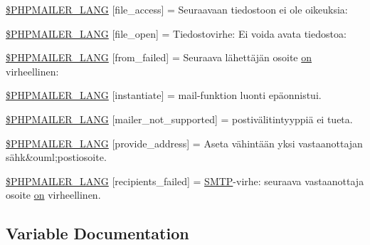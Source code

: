 \begin{DoxyCompactItemize}
\hyperlink{phpmailer_8lang-fi_8php_a7e83349023b856ef9e5c46e30ae6d51e}{\$\+P\+H\+P\+M\+A\+I\+L\+E\+R\+\_\+\+L\+A\+NG} \mbox{[}\textquotesingle{}file\+\_\+access\textquotesingle{}\mbox{]} = \textquotesingle{}Seuraavaan tiedostoon ei ole oikeuksia\+: \textquotesingle{}
\item 
\hyperlink{phpmailer_8lang-fi_8php_a28d1a6517bf4c942a0ddd506188ad2e0}{\$\+P\+H\+P\+M\+A\+I\+L\+E\+R\+\_\+\+L\+A\+NG} \mbox{[}\textquotesingle{}file\+\_\+open\textquotesingle{}\mbox{]} = \textquotesingle{}Tiedostovirhe\+: Ei voida avata tiedostoa\+: \textquotesingle{}
\item 
\hyperlink{phpmailer_8lang-fi_8php_adf832ae12155a09be077c6d5e4fd7e22}{\$\+P\+H\+P\+M\+A\+I\+L\+E\+R\+\_\+\+L\+A\+NG} \mbox{[}\textquotesingle{}from\+\_\+failed\textquotesingle{}\mbox{]} = \textquotesingle{}Seuraava lähettäjän osoite \hyperlink{fullpage_2plugin_8min_8js_a0258429d15d28b8440a6c44b3a15f390}{on} virheellinen\+: \textquotesingle{}
\item 
\hyperlink{phpmailer_8lang-fi_8php_ad58dde16780f4770ccf4dd282ea1f5ad}{\$\+P\+H\+P\+M\+A\+I\+L\+E\+R\+\_\+\+L\+A\+NG} \mbox{[}\textquotesingle{}instantiate\textquotesingle{}\mbox{]} = \textquotesingle{}mail-\/funktion luonti epäonnistui.\textquotesingle{}
\item 
\hyperlink{phpmailer_8lang-fi_8php_aa2ebcb8833ee83a7ad67401c4bb3a6ad}{\$\+P\+H\+P\+M\+A\+I\+L\+E\+R\+\_\+\+L\+A\+NG} \mbox{[}\textquotesingle{}mailer\+\_\+not\+\_\+supported\textquotesingle{}\mbox{]} = \textquotesingle{}postivälitintyyppiä ei tueta.\textquotesingle{}
\item 
\hyperlink{phpmailer_8lang-fi_8php_a8b97897c2406b7392b056f375feeefbb}{\$\+P\+H\+P\+M\+A\+I\+L\+E\+R\+\_\+\+L\+A\+NG} \mbox{[}\textquotesingle{}provide\+\_\+address\textquotesingle{}\mbox{]} = \textquotesingle{}Aseta vähintään yksi vastaanottajan sähk\&ouml;postiosoite.\textquotesingle{}
\item 
\hyperlink{phpmailer_8lang-fi_8php_a7589d30bb9b368327c2df015f3e6bcba}{\$\+P\+H\+P\+M\+A\+I\+L\+E\+R\+\_\+\+L\+A\+NG} \mbox{[}\textquotesingle{}recipients\+\_\+failed\textquotesingle{}\mbox{]} = \textquotesingle{}\hyperlink{class_s_m_t_p}{S\+M\+TP}-\/virhe\+: seuraava vastaanottaja osoite \hyperlink{fullpage_2plugin_8min_8js_a0258429d15d28b8440a6c44b3a15f390}{on} virheellinen.\textquotesingle{}
\end{DoxyCompactItemize}


\subsection{Variable Documentation}
